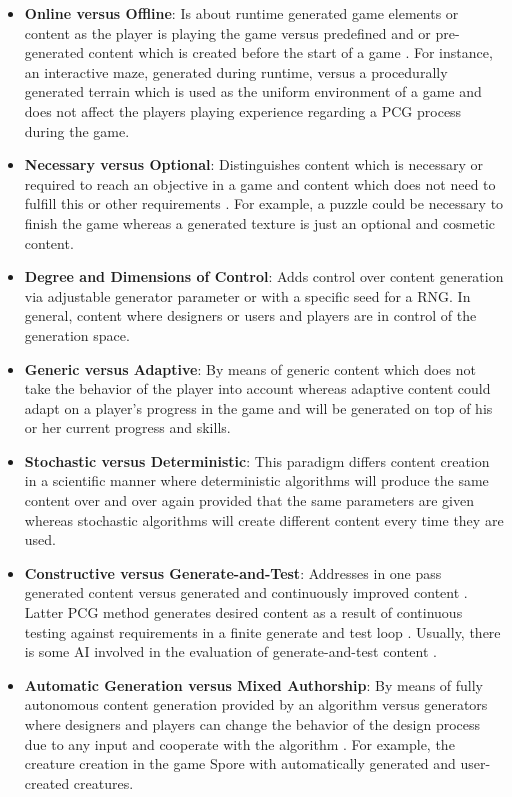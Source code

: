 \documentclass[MGS,Master,english]{twbook}%
\begin{document}
\begin{itemize}
	\item \textbf{Online versus Offline}: Is about runtime generated game elements or content as the player is playing the game versus predefined and or pre-generated content which is created before the start of a game \cite{pcg::book}. For instance, an interactive maze, generated during runtime, versus a procedurally generated terrain which is used as the uniform environment of a game and does not affect the players playing experience regarding a \ac{PCG} process during the game.
	\item \textbf{Necessary versus Optional}: Distinguishes content which is necessary or required to reach an objective in a game and content which does not need to fulfill this or other requirements \cite{pcg::book}. For example, a puzzle could be necessary to finish the game whereas a generated texture is just an optional and cosmetic content.
	\item \textbf{Degree and Dimensions of Control}: Adds control over content generation via adjustable generator parameter or with a specific seed for a \ac{RNG}. In general, content where designers or users and players are in control of the generation space. \cite{pcg::book}
	\item \textbf{Generic versus Adaptive}: By means of generic content which does not take the behavior of the player into account whereas adaptive content could adapt on a player's progress in the game and will be generated on top of his or her current progress and skills. \cite{pcg::book}
	\item \textbf{Stochastic versus Deterministic}: This paradigm differs content creation in a scientific manner where deterministic algorithms will produce the same content over and over again provided that the same parameters are given whereas stochastic algorithms will create different content every time they are used. \cite{pcg::book}
	\item \textbf{Constructive versus Generate-and-Test}: Addresses in one pass generated content versus generated and continuously improved content \cite{pcg::book}. Latter \ac{PCG} method generates desired content as a result of continuous testing against requirements in a finite generate and test loop \cite{pcg::book}. Usually, there is some \ac{AI} involved in the evaluation of generate-and-test content \cite{pcg::book}. 
	\item \textbf{Automatic Generation versus Mixed Authorship}: By means of fully autonomous content generation provided by an algorithm versus generators where designers and players can change the behavior of the design process due to any input and cooperate with the algorithm \cite{pcg::book}. For example, the creature creation in the game Spore \cite{game::spore} with automatically generated and user-created creatures.
\end{itemize}
\end{document}
